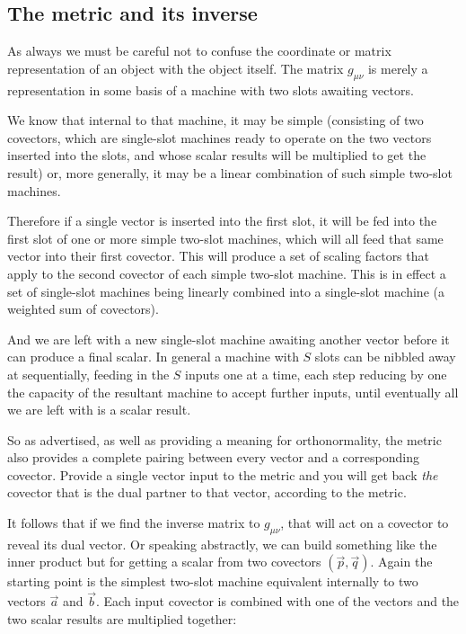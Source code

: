 \subsection{The metric and its inverse}

As always we must be careful not to confuse the coordinate or matrix representation of an object with the object itself. The matrix $g_{\mu\nu}$ is merely a representation in some basis of a machine with two slots awaiting vectors. 

We know that internal to that machine, it may be simple (consisting of two covectors, which are single-slot machines ready to operate on the two vectors inserted into the slots, and whose scalar results will be multiplied to get the result) or, more generally, it may be a linear combination of such simple two-slot machines.

Therefore if a single vector is inserted into the first slot, it will be fed into the first slot of one or more simple two-slot machines, which will all feed that same vector into their first covector. This will produce a set of scaling factors that apply to the second covector of each simple two-slot machine. This is in effect a set of single-slot machines being linearly combined into a single-slot machine (a weighted sum of covectors).

And we are left with a new single-slot machine awaiting another vector before it can produce a final scalar. In general a machine with $S$ slots can be nibbled away at sequentially, feeding in the $S$ inputs one at a time, each step reducing by one the capacity of the resultant machine to accept further inputs, until eventually all we are left with is a scalar result.

So as advertised, as well as providing a meaning for orthonormality, the metric also provides a complete pairing between every vector and a corresponding covector. Provide a single vector input to the metric and you will get back \textit{the} covector that is the dual partner to that vector, according to the metric.

It follows that if we find the inverse matrix to $g_{\mu\nu}$, that will act on a covector to reveal its dual vector. Or speaking abstractly, we can build something like the inner product but for getting a scalar from two covectors $(\vec{p}, \vec{q})$. Again the starting point is the simplest two-slot machine equivalent internally to two vectors $\vec{a}$ and $\vec{b}$. Each input covector is combined with one of the vectors and the two scalar results are multiplied together:

